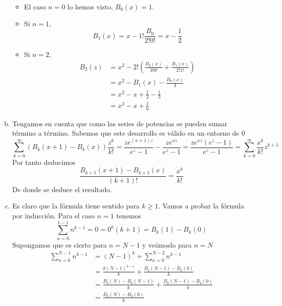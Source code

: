 \documentclass[twoside]{article}
\begin{document}
\begin{solucion}
\begin{enumerate}[(a)]
\begin{itemize}
\item El caso $n=0$ lo hemos visto, $B_0(x)=1$.
\item Si $n=1$,
$$
B_1(x)=x-1!\frac{B_0}{2!0!}=x-\frac{1}{2}
$$
\item Si $n=2$,
\begin{align*}
B_2(z)&=x^2 - 2!\left(\frac{B_0(x)}{3!0!}+\frac{B_1(x)}{2!1!}\right)\\
&= x^2 -B_1(x) - \frac{B_0(x)}{3}\\
&=x^2 -x+\frac{1}{2}-\frac{1}{3}\\
&= x^2-x + \frac{1}{6}
\end{align*}
\end{itemize}
%
\item Tengamos en cuenta que como las series de potencias se pueden sumar término a término. Sabemos que este desarrollo es válido en un entorno de $0$
$$
\sum_{k=0}^\infty(B_k(x+1)-B_k(x))\frac{z^k}{k!}=\frac{ze^{(x+1)z}}{e^z-1}- \frac{ze^{xz}}{e^z-1} = \frac{ze^{xz}(e^z-1)}{e^z-1} = \sum_{k=0}^\infty \frac{x^{k}}{k!}z^{k+1}
$$
Por tanto deducimos
$$
\frac{B_{k+1}(x+1)-B_{k+1}(x)}{(k+1)!} = \frac{x^k}{k!}
$$
De donde se deduce el resultado.
\item Es claro que la fórmula tiene sentido para $k\geq 1$. Vamos a probar la fórmula por inducción. Para el caso $n=1$ tenemos
$$\sum_{n=0}^{1-1} n^{k-1} =0= 0^k(k+1)  = B_k(1)-B_k(0)
$$
Supongamos que es cierto para $n=N-1$ y veámoslo para $n=N$
\begin{align*}
\sum_{n=0}^{N-1} n^{k-1} &= (N-1)^k + \sum_{n=0}^{N-2} n^{k-1} \\
&=\frac{k(N-1)^{k-1}}{k}+ \frac{B_k(N-1)-B_k(0)}{k} \\
&=\frac{B_k(N)-B_k(N-1)}{k}  + \frac{B_k(N-1)-B_k(0)}{k}\\
&= \frac{B_k(N)-B_k(0)}{k}
\end{align*}
\end{enumerate}
\end{solucion}
\end{document}

